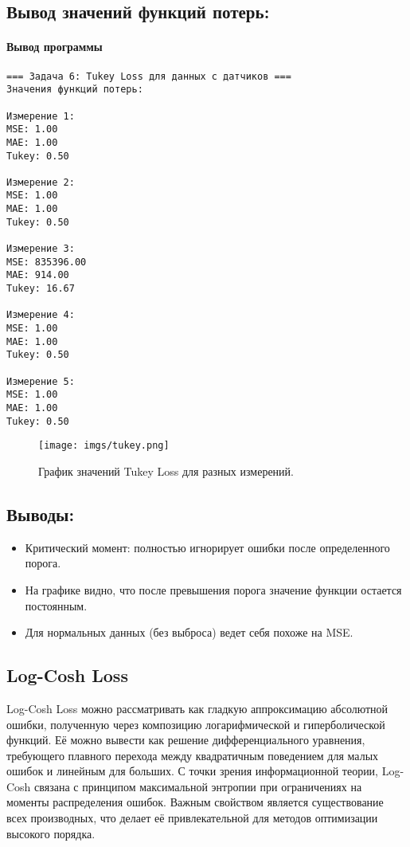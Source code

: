 \subsection*{Вывод значений функций потерь:}
\paragraph{Вывод программы}
\begin{verbatim}
=== Задача 6: Tukey Loss для данных с датчиков ===
Значения функций потерь:

Измерение 1:
MSE: 1.00
MAE: 1.00
Tukey: 0.50

Измерение 2:
MSE: 1.00
MAE: 1.00
Tukey: 0.50

Измерение 3:
MSE: 835396.00
MAE: 914.00
Tukey: 16.67

Измерение 4:
MSE: 1.00
MAE: 1.00
Tukey: 0.50

Измерение 5:
MSE: 1.00
MAE: 1.00
Tukey: 0.50
\end{verbatim}

\begin{figure}[h!]
    \centering
    \texttt{[image: imgs/tukey.png]}
    \caption{График значений Tukey Loss для разных измерений.}
\end{figure}

\subsection*{Выводы:}
\begin{itemize}
    \item Критический момент: полностью игнорирует ошибки после определенного порога.
    \item На графике видно, что после превышения порога значение функции остается постоянным.
    \item Для нормальных данных (без выброса) ведет себя похоже на MSE.
\end{itemize}

\subsection{Log-Cosh Loss}

Log-Cosh Loss можно рассматривать как гладкую аппроксимацию абсолютной ошибки, полученную через композицию логарифмической и гиперболической функций. Её можно вывести как решение дифференциального уравнения, требующего плавного перехода между квадратичным поведением для малых ошибок и линейным для больших. С точки зрения информационной теории, Log-Cosh связана с принципом максимальной энтропии при ограничениях на моменты распределения ошибок. Важным свойством является существование всех производных, что делает её привлекательной для методов оптимизации высокого порядка.

